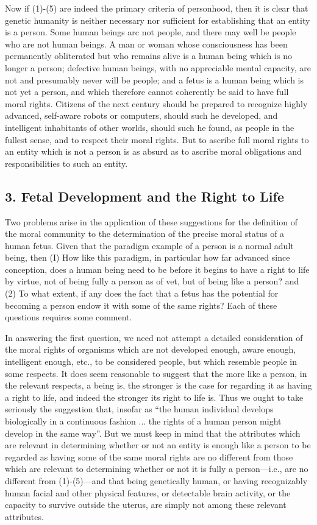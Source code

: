Now if (1)-(5) are indeed the primary criteria of
personhood, then it is clear that genetic humanity is
neither necessary nor sufficient for establishing that an
entity is a person. Some human beings arc not people, and
there may well be people who are not human beings. A
man or woman whose consciousness has been
permanently obliterated but who remains alive is a human
being which is no longer a person; defective human
beings, with no appreciable mental capacity, are not and
presumably never will be people; and a fetus is a human
being which is not yet a person, and which therefore
cannot coherently be said to have full moral rights.
Citizens of the next century should be prepared to
recognize highly advanced, self-aware robots or
computers, should such he developed, and intelligent
inhabitants of other worlds, should such he found, as
people in the fullest sense, and to respect their moral
rights. But to ascribe full moral rights to an entity which
is not a person is as absurd as to ascribe moral obligations
and responsibilities to such an entity.

\subsection{3. Fetal Development and the Right to Life}

Two problems arise in the application of these
suggestions for the definition of the moral community to
the determination of the precise moral status of a human
fetus. Given that the paradigm example of a person is a
normal adult being, then (I) How like this paradigm, in
particular how far advanced since conception, does a
human being need to be before it begins to have a right to
life by virtue, not of being fully a person as of vet, but of
being like a person? and (2) To what extent, if any does
the fact that a fetus has the potential for becoming a
person endow it with some of the same rights? Each of
these questions requires some comment.

In answering the first question, we need not attempt a
detailed consideration of the moral rights of organisms
which are not developed enough, aware enough,
intelligent enough, etc., to be considered people, but
which resemble people in some respects. It does seem
reasonable to suggest that the more like a person, in the
relevant respects, a being is, the stronger is the case for
regarding it as having a right to life, and indeed the
stronger its right to life is. Thus we ought to take seriously
the suggestion that, insofar as “the human individual
develops biologically in a continuous fashion ... the rights
of a human person might develop in the same way”. \autocite{Hayes1} But
we must keep in mind that the attributes which are
relevant in determining whether or not an entity is enough
like a person to be regarded as having some of the same
moral rights are no different from those which are
relevant to determining whether or not it is fully a
person—i.e., are no different from (1)-(5)—and that being
genetically human, or having recognizably human facial
and other physical features, or detectable brain activity, or
the capacity to survive outside the uterus, are simply not
among these relevant attributes.

